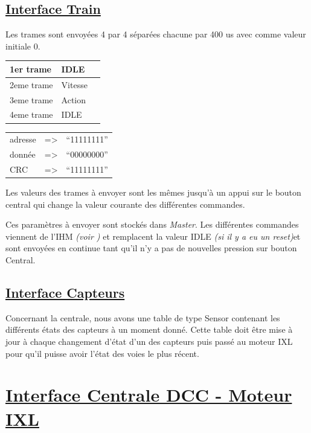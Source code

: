 \subsection{\underline{Interface Train}}
\label{sec:int_train}

\bigskip
Les trames sont envoyées 4 par 4 séparées chacune par 400 us avec comme valeur initiale 0.
\begin{center}
\begin{tabular}{|l|l|l|}
  \hline
  1er trame & IDLE \\
  \hline
  2eme trame & Vitesse \\
  \hline
  3eme trame & Action \\
  \hline
  4eme trame & IDLE \\
  \hline
\end{tabular}
\end{center}

\medskip
\begin{center}
\begin{tabular}{lll}
adresse & => & ``11111111'' \\
donnée  & => & ``00000000'' \\
CRC     & => & ``11111111'' \\
\end{tabular}
\end{center}

\medskip
Les valeurs des trames à envoyer sont les mêmes jusqu'à un appui sur
le bouton central qui change la valeur courante des différentes
commandes.

Ces paramètres à envoyer sont stockés dans \emph{Master}.
\medskip
Les différentes commandes viennent de l'IHM \emph{(voir
  \cite{rapport})}  et remplacent la valeur IDLE \emph{(si il y a eu
  un reset)}et sont envoyées en continue tant qu'il n'y a pas de nouvelles pression sur bouton Central.


\subsection{\underline{Interface Capteurs}}
\label{sec:int_cap}

Concernant la centrale, nous avons  une table de type Sensor
contenant les différents états des capteurs à un moment donné. Cette
table doit être mise à jour à chaque changement d'état d'un des
capteurs puis passé au moteur IXL pour qu'il puisse avoir l'état des
voies le plus récent. 

\newpage
\section{\underline{Interface Centrale DCC - Moteur IXL}}
\label{sec:int_ixl}   

